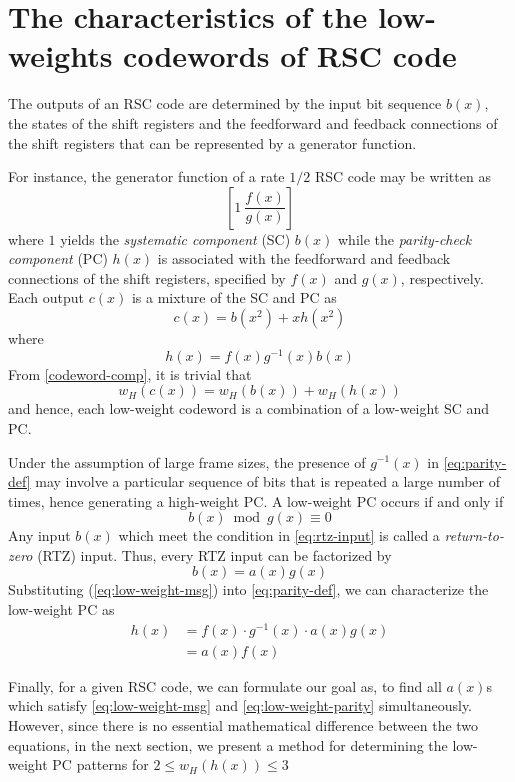 \section{The characteristics of the low-weights codewords of RSC code}
\label{sec2}
The outputs of an RSC code are determined by the input bit sequence $b(x)$, the states of the shift registers and the feedforward and feedback connections of the shift registers that can be represented by a generator function. 

For instance,  the generator function of a rate $1/2$ RSC code may be written as  $$\left[1 ~\frac{f(x)}{g(x)}\right]$$ where $1$ yields the \textit{systematic  component} (SC) $b(x)$ while the \textit{parity-check component} (PC) $h(x)$ is associated with the feedforward and feedback connections of the shift registers, specified by $f(x)$ and $g(x)$, respectively. Each output $c(x)$ is a mixture of the SC and PC as
\begin{equation}
c(x) = b(x^2)+xh(x^2)
\label{codeword-comp}
\end{equation}
where 
\begin{equation}
h(x) =f(x)g^{-1}(x)b(x)
\label{eq:parity-def}
\end{equation}
From \eqref{codeword-comp}, it is trivial that
\begin{equation}
w_H(c(x))=w_H(b(x)) + w_H(h(x))
\label{eq:cw-weight}
\end{equation}
and hence, each low-weight codeword is a combination of a low-weight SC and PC.

Under the assumption of large frame sizes, the presence of $g^{-1}(x)$  in \eqref{eq:parity-def} may involve a particular sequence of bits that is repeated a large number of times, hence generating a high-weight PC. A low-weight PC occurs if and only if
\begin{equation}
b(x) \bmod g(x) \equiv 0
\label{eq:rtz-input}
\end{equation}
Any input $b(x)$ which meet the condition in \eqref{eq:rtz-input} is called a \textit{return-to-zero} (RTZ) input. Thus, every RTZ input can be factorized by  
\begin{equation}
b(x) =a(x)g(x)
\label{eq:low-weight-msg}
\end{equation}
Substituting (\ref{eq:low-weight-msg}) into \eqref{eq:parity-def}, we can characterize the low-weight PC as
\begin{equation}
\begin{split}
h(x)&=f(x)\cdot g^{-1}(x)\cdot a(x)g(x)\\
&=a(x)f(x)
\end{split}
\label{eq:low-weight-parity}
\end{equation}

Finally, for a given RSC code, we can formulate our goal as, to find all $a(x)$s which satisfy  \eqref{eq:low-weight-msg} and  \eqref{eq:low-weight-parity} simultaneously. However, since there is no essential mathematical difference between the two equations, in the next section, we present a method for determining the low-weight PC patterns for $2 \leq w_H(h(x)) \leq 3$


